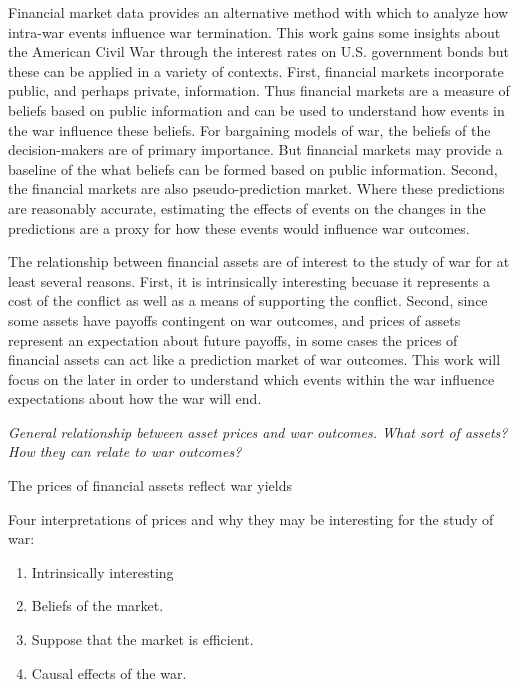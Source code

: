 
Financial market data provides an alternative method with which to analyze how intra-war events influence war termination.
This work gains some insights about the American Civil War through the interest rates on U.S. government bonds but these can be applied in a variety of contexts.
First, financial markets incorporate public, and perhaps private, information.
Thus financial markets are a measure of beliefs based on public information and can be used to understand how events in the war influence these beliefs.
For bargaining models of war, the beliefs of the decision-makers are of primary importance.
But financial markets may provide a baseline of the what beliefs can be formed based on public information.
Second, the financial markets are also pseudo-prediction market.
Where these predictions are reasonably accurate, estimating the effects of events on the changes in the predictions are a proxy for how these events would influence war outcomes.

The relationship between financial assets are of interest to the study of war for at least several reasons.
First, it is intrinsically interesting becuase it represents a cost of the conflict as well as a means of supporting the conflict.
Second, since some assets have payoffs contingent on war outcomes, and prices of assets represent an expectation about future payoffs, in some cases the prices of financial assets can act like a prediction market of war outcomes.
This work will focus on the later in order to understand which events within the war influence expectations about how the war will end.

\textit{General relationship between asset prices and war outcomes. What sort of assets? How they can relate to war outcomes?}

The prices of financial assets reflect war yields 


Four interpretations of prices and why they may be interesting for the study of war:

\begin{enumerate}
\item Intrinsically interesting
\item Beliefs of the market.
\item Suppose that the market is efficient.
\item Causal effects of the war.
\end{enumerate}

